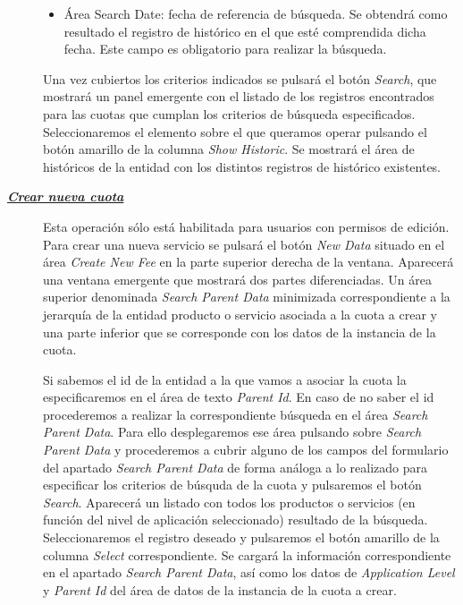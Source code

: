 \begin{description}
\begin{itemize}
\begin{itemize}
	\end{itemize}	    	
	\item Área Search Date: fecha de referencia de búsqueda. Se obtendrá como resultado el registro de histórico en el que esté comprendida dicha fecha. Este campo es obligatorio para realizar la búsqueda.
\end{itemize}

Una vez cubiertos los criterios indicados se pulsará el botón \emph{Search}, que mostrará un panel emergente con el listado de los registros encontrados para las cuotas que cumplan los criterios de búsqueda especificados. Seleccionaremos el elemento sobre el que queramos operar pulsando el botón amarillo de la columna \emph{Show Historic}. Se mostrará el área de históricos de la entidad con los distintos registros de histórico existentes.


\item[\underline{\textsl{\textbf{Crear nueva cuota}}}] Esta operación sólo está habilitada para usuarios con permisos de edición.
Para crear una nueva servicio se pulsará el botón \textit{New Data} situado en el área \emph{Create New Fee} en la parte superior derecha de la ventana. Aparecerá una ventana emergente que mostrará dos partes diferenciadas. Un área superior denominada \emph{Search Parent Data} minimizada correspondiente a la jerarquía de la entidad producto o servicio asociada a la cuota a crear y una parte inferior que se corresponde con los datos de la instancia de la cuota.

Si sabemos el id de la entidad a la que vamos a asociar la cuota la especificaremos en el área de texto \emph{Parent Id}. En caso de no saber el id procederemos a realizar la correspondiente búsqueda en el área  \emph{Search Parent Data}. Para ello desplegaremos ese área pulsando sobre \emph{Search Parent Data} y procederemos a cubrir alguno de los campos del formulario del apartado \emph{Search Parent Data} de forma análoga a lo realizado para especificar los criterios de búsquda de la cuota y pulsaremos el botón \emph{Search}. Aparecerá un listado con todos los productos o servicios (en función del nivel de aplicación seleccionado) resultado de la búsqueda. Seleccionaremos el registro deseado y pulsaremos el botón amarillo de la columna \emph{Select} correspondiente. Se cargará la información correspondiente en el apartado \emph{Search Parent Data}, así como los datos de \emph{Application Level} y \emph{Parent Id} del área de datos de la instancia de la cuota a crear.


\end{description}
